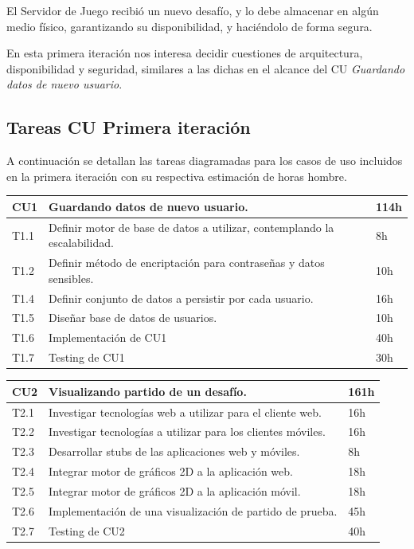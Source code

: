 \documentclass[a4paper, 10pt, twoside]{article}
\begin{document}
El Servidor de Juego recibió un nuevo desafío, y lo debe almacenar en algún medio físico, garantizando su disponibilidad, y haciéndolo de forma segura.

En esta primera iteración nos interesa decidir cuestiones de arquitectura, disponibilidad y seguridad, similares a las dichas en el alcance del CU \textit{Guardando datos de nuevo usuario}.

\subsection{Tareas CU Primera iteración}
A continuación se detallan las tareas diagramadas para los casos de uso incluidos en la primera iteración con su respectiva estimación de horas hombre.
\\

\begin{tabular}{lp{13cm}l}
  \hline
  CU1 & Guardando datos de nuevo usuario. & 114h \\
  \hline
  T1.1 & Definir motor de base de datos a utilizar, contemplando la escalabilidad. & 8h \\
  T1.2 & Definir método de encriptación para contraseñas y datos sensibles. & 10h \\
  T1.4 & Definir conjunto de datos a persistir por cada usuario. & 16h \\
  T1.5 & Diseñar base de datos de usuarios. & 10h \\
  T1.6 & Implementación de CU1 & 40h\\
  T1.7 & Testing de CU1 & 30h\\
  \hline
\end{tabular}

\vspace{1em}

\begin{tabular}{lp{13cm}l}
  \hline
  CU2 & Visualizando partido de un desafío. & 161h \\
  \hline
  T2.1 & Investigar tecnologías web a utilizar para el cliente web. & 16h \\
  T2.2 & Investigar tecnologías a utilizar para los clientes móviles. & 16h \\
  T2.3 & Desarrollar stubs de las aplicaciones web y móviles. & 8h \\
  T2.4 & Integrar motor de gráficos 2D a la aplicación web. & 18h \\
  T2.5 & Integrar motor de gráficos 2D a la aplicación móvil. & 18h \\
  T2.6 & Implementación de una visualización de partido de prueba. & 45h \\
  T2.7 & Testing de CU2 & 40h\\
  \hline
\end{tabular}
\end{document}
